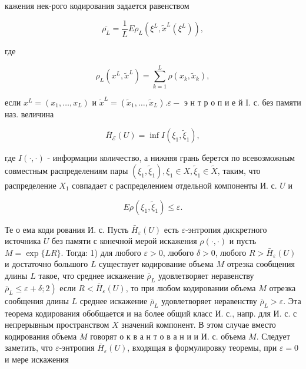 \documentclass[10pt]{article}
\begin{document}
кажения нек-рого кодирования задается равенством



\[

\overline{\rho_{L}}=\frac{1}{L} E \rho_{L}\left(\xi^{L}, \tilde{x}^{L}\left(\xi^{L}\right)\right),

\]



где



\[

\rho_{L}\left(x^{L}, \tilde{x}^{L}\right)=\sum_{k=1}^{L} \rho\left(x_{k}, \tilde{x}_{k}\right),

\]



если $x^{L}=\left(x_{1}, \ldots, x_{L}\right)$ и $\tilde{x}^{L}=\left(\tilde{x}_{1}, \ldots, \tilde{x}_{L}\right) . \varepsilon-$ э н т р о п и е й I. с. без памяти наз. величина



\[

\bar{H}_{\mathcal{E}}(U)=\inf I\left(\xi_{1}, \tilde{\xi}_{1}\right),

\]



где $I(\cdot, \cdot)$ - информации количество, а нижняя грань берется по всевозможным совместным распределениям пары $\left(\xi_{1}, \tilde{\xi}_{1}\right), \xi_{1} \in X, \tilde{\xi}_{1} \in \tilde{X}$, таким, что распределение $X_{1}$ совпадает с распределением отдельной компоненты И. с. $U$ и



\[

E \rho\left(\xi_{1}, \tilde{\xi}_{1}\right) \leqslant \varepsilon .

\]



Те о ема коди рования И. с. Пусть $\bar{H}_{\varepsilon}(U)$ есть $\varepsilon$-энтропия дискретного источника $U$ без памяти с конечной мерой искажения $\rho(\cdot, \cdot)$ и пусть $M=\exp \{L R\}$. Тогда: 1) для любого $\varepsilon>0$, любого $\delta>0$, любого $R>\bar{H}_{\varepsilon}(U)$ и достаточно большого $L$ существует кодирование объема $M$ отрезка сообщения длины $L$ такое, что среднее искажение $\bar{\rho}_{L}$ удовлетворяет неравенству $\left.\bar{\rho}_{L} \leqslant \varepsilon+\delta ; 2\right)$ если $R<\bar{H}_{\varepsilon}(U)$, то при любом кодировании объема $M$ отрезка сообщения длины $L$ среднее искажение $\bar{\rho}_{L}$ удовлетворяет неравенству $\bar{\rho}_{L}>\varepsilon$. Эта теорема кодирования обобщается и на более общий класс И. с., напр. для И. с. с непрерывным пространством $X$ значений компонент. В этом случае вместо кодирования объема $M$ говорят о к в а н т о в а н и и И. с. объема $M$. Следует заметить, что $\varepsilon$-энтропия $\bar{H}_{\varepsilon}(U)$, входящая в формулировку теоремы, при $\varepsilon=0$ и мере искажения
\end{document}
